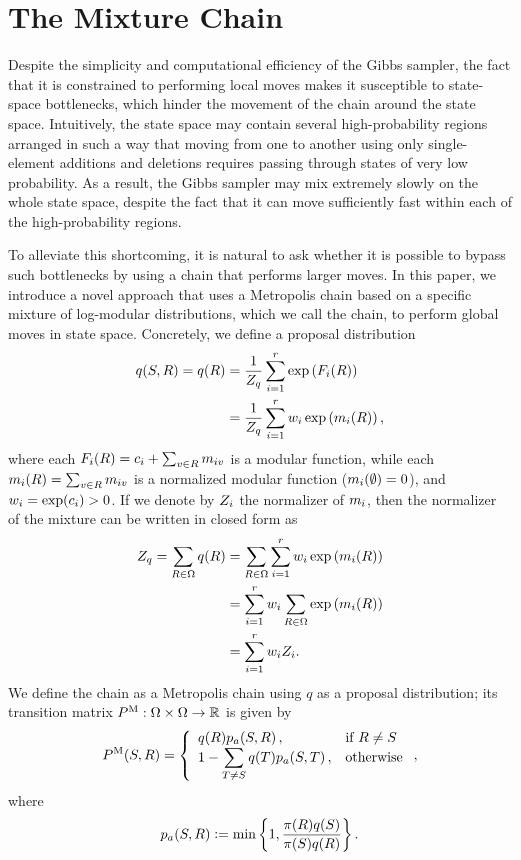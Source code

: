 \section{The Mixture Chain}
Despite the simplicity and computational efficiency of the Gibbs sampler, the fact that it is constrained to performing local moves makes it susceptible to state-space bottlenecks, which hinder the movement of the chain around the state space.
Intuitively, the state space may contain several high-probability regions arranged in such a way that moving from one to another using only single-element additions and deletions requires passing through states of very low probability.
As a result, the Gibbs sampler may mix extremely slowly on the whole state space, despite the fact that it can move sufficiently fast within each of the high-probability regions.

To alleviate this shortcoming, it is natural to ask whether it is possible to bypass such bottlenecks by using a chain that performs larger moves.
In this paper, we introduce a novel approach that uses a Metropolis chain based on a specific mixture of log-modular distributions, which we call the \Ms{} chain, to perform global moves in state space.
Concretely, we define a proposal distribution
\begin{align} \label{eq:qprop}
  q(S, R) = q(R) &= \frac{1}{Z_q} \sum_{i = 1}^{r} \exp\left( F_i(R) \right) \nonumber\\
                 &= \frac{1}{Z_q} \sum_{i = 1}^{r} w_i \exp\left(m_i(R) \right),
\end{align}
where each $F_i(R) = c_i + \sum_{v \in R}m_{iv}$ is a modular function, while each $m_i(R) = \sum_{v \in R}m_{iv}$ is a normalized modular function ($m_i(\emptyset) = 0$), and $w_i = \exp(c_i) > 0$.
If we denote by $Z_i$ the normalizer of $m_i$, then the normalizer of the mixture can be written in closed form as
\begin{align*}
  Z_q = \sum_{R \in \Omega}q(R) &= \sum_{R \in \Omega}\sum_{i = 1}^{r} w_i \exp\left(m_i(R) \right)\\
                                &= \sum_{i = 1}^{r} w_i \sum_{R \in \Omega} \exp\left(m_i(R) \right)\\
                                &= \sum_{i = 1}^r w_i Z_i.
\end{align*}
We define the \Ms{} chain as a Metropolis chain \citep{levin08book} using $q$ as a proposal distribution; its transition matrix $P^{\mathrm{M}} : \Omega \times \Omega \to \mathbb{R}$ is given by
\begin{align*}
  P^{\mathrm{M}}(S, R) = \left\{ \begin{array}{ll} q(R) p_a(S, R)\,,& \mbox{if } R \neq S \\ 1 - \displaystyle\sum_{T \neq S} q(T) p_a(S, T)\,,& \mbox{otherwise} \end{array} \right.,
\end{align*}
where
\begin{align*}
  p_{a}(S, R) \vcentcolon= \min\left\{1, \displaystyle\frac{\pi(R)q(S)}{\pi(S)q(R)}\right\}.
\end{align*}

